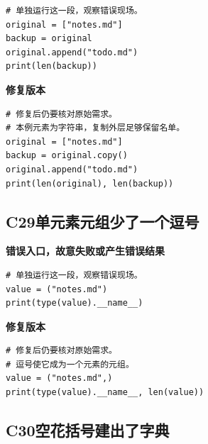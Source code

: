 \begin{lstlisting}[style=errorcode,title={错误复现（故意失败或错误结果）：\code{case_28_bad.py.txt}}]
# 单独运行这一段，观察错误现场。
original = ["notes.md"]
backup = original
original.append("todo.md")
print(len(backup))
\end{lstlisting}

\textbf{修复版本}

\begin{lstlisting}[title={\code{case_28.py}}]
# 修复后仍要核对原始需求。
# 本例元素为字符串，复制外层足够保留名单。
original = ["notes.md"]
backup = original.copy()
original.append("todo.md")
print(len(original), len(backup))
\end{lstlisting}


\subsection*{C29\enspace 单元素元组少了一个逗号}





\textbf{错误入口，故意失败或产生错误结果}

\begin{lstlisting}[style=errorcode,title={错误复现（故意失败或错误结果）：\code{case_29_bad.py.txt}}]
# 单独运行这一段，观察错误现场。
value = ("notes.md")
print(type(value).__name__)
\end{lstlisting}

\textbf{修复版本}

\begin{lstlisting}[title={\code{case_29.py}}]
# 修复后仍要核对原始需求。
# 逗号使它成为一个元素的元组。
value = ("notes.md",)
print(type(value).__name__, len(value))
\end{lstlisting}


\subsection*{C30\enspace 空花括号建出了字典}

